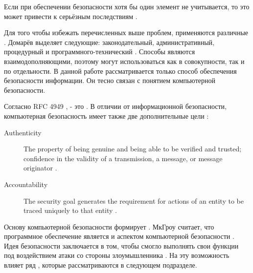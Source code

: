 %
Если при обеспечении безопасности хотя бы один элемент  не учитывается, то это может привести к серьёзным последствиям .
%
%
%

%
Для того чтобы избежать перечисленных выше проблем, применяются различные .
%
Домарёв выделяет следующие: законодательный, административный, процедурный и программного-технический . 
%
Способы являются взаимодополняющими, поэтому могут использоваться как в совокупности, так и по отдельности. 
%
В данной работе рассматривается только  способ обеспечения безопасности информации.
%
Он тесно связан с понятием компьютерной безопасности.

%
Согласно RFC 4949 ,  - это .
%
В отличии от информационной безопасности, компьютерная безопасность имеет также две дополнительные цели : 
%
\begin{description}

	\item[Authenticity] The property of being genuine and being able to be verified and trusted; confidence in the validity of a transmission, a message, or message originator .

	\item[Accountability] The security goal generates the requirement for actions of an entity to be traced uniquely to that entity .
\end{description}

%
Основу компьютерной безопасности формирует .
%
МкГроу считает, что программное обеспечение является  и  аспектом компьютерной безопасности . 
%
Идея безопасности  заключается в том, чтобы  смогло  выполнять свои функции под воздействием атаки со стороны злоумышленника .
%
На эту возможность влияет ряд , которые рассматриваются в следующем подразделе.